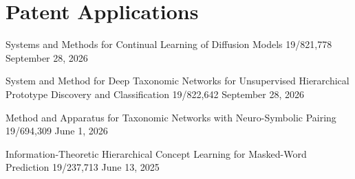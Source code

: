 \section{Patent Applications}

\CVPatent
  {Systems and Methods for Continual Learning of Diffusion Models}
  {19/821,778}
  {September 28, 2026}

\CVPatent
  {System and Method for Deep Taxonomic Networks for Unsupervised Hierarchical Prototype Discovery and Classification}
  {19/822,642}
  {September 28, 2026}

\CVPatent
  {Method and Apparatus for Taxonomic Networks with Neuro-Symbolic Pairing}
  {19/694,309}
  {June 1, 2026}

\CVPatent
  {Information-Theoretic Hierarchical Concept Learning for Masked-Word Prediction}
  {19/237,713}
  {June 13, 2025}
